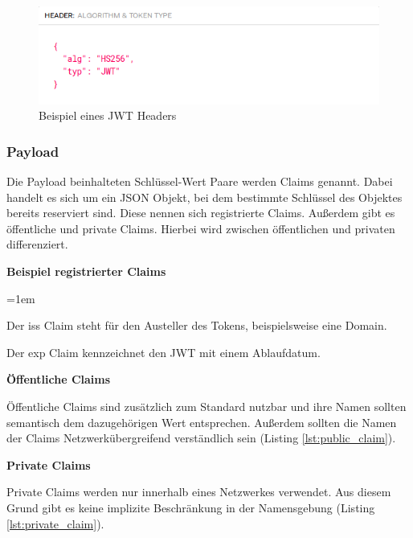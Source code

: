 \begin{figure}[h]
	\centering
	\includegraphics[width=\textwidth]{graphics/jwt-header.png}
	\caption{Beispiel eines \gls{JWT} Headers }
	\label{fig:jwt-header}
\end{figure}

\subsubsection{Payload}
\label{sec: jwt-payload}

Die Payload beinhalteten Schlüssel-Wert Paare werden Claims genannt. Dabei handelt es sich um ein JSON Objekt, bei dem bestimmte Schlüssel des Objektes bereits reserviert sind. Diese nennen sich registrierte Claims. Au{\ss}erdem gibt es öffentliche und private Claims. Hierbei wird zwischen öffentlichen und privaten differenziert.

\noindent
\textbf{Beispiel registrierter Claims}

\begin{description}
	\leftskip=1em
	\item[iss]
	Der iss Claim steht für den Austeller des Tokens, beispielsweise eine Domain.
	\item[exp] Der exp Claim kennzeichnet den \gls{JWT} mit einem Ablaufdatum.
\end{description}

\noindent
\textbf{Öffentliche Claims}

Öffentliche Claims sind zusätzlich zum Standard nutzbar und ihre Namen sollten semantisch dem dazugehörigen Wert entsprechen. Au{\ss}erdem sollten die Namen der Claims Netzwerkübergreifend verständlich sein (Listing \ref{lst:public_claim}).

\noindent
\textbf{Private Claims}

Private Claims werden nur innerhalb eines Netzwerkes verwendet. Aus diesem Grund gibt es keine implizite Beschränkung in der Namensgebung (Listing \ref{lst:private_claim}).

\begin{minipage}{\linewidth}
	

	
\end{minipage}

